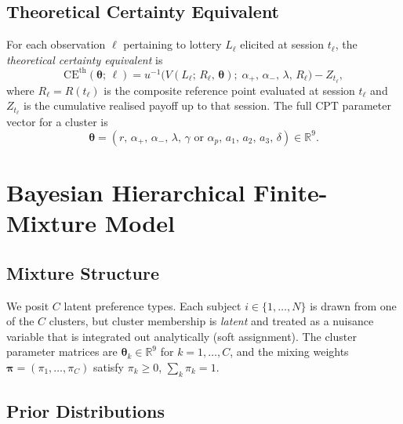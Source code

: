 \documentclass[12pt, a4paper]{article}
\newcommand{\R}{\mathbb{R}}
\newcommand{\btheta}{\bm{\theta}}
\newcommand{\bpi}{\bm{\pi}}
\begin{document}
\subsection{Theoretical Certainty Equivalent}
\label{sec:ce}

For each observation $\ell$ pertaining to lottery $L_\ell$ elicited at session
$t_\ell$, the \emph{theoretical certainty equivalent} is
\begin{equation}
  \mathrm{CE}^{\mathrm{th}}(\btheta;\, \ell)
  = u^{-1}\!\bigl(V(L_\ell;\, R_\ell,\, \btheta);\;
                  \alpha_+,\, \alpha_-,\, \lambda,\, R_\ell\bigr)
  - Z_{t_\ell},
  \label{eq:ce_th}
\end{equation}
where $R_\ell = R(t_\ell)$ is the composite reference point evaluated at
session $t_\ell$ and $Z_{t_\ell}$ is the cumulative realised payoff up to that
session.  The full CPT parameter vector for a cluster is
\begin{equation}
  \btheta = (r,\, \alpha_+,\, \alpha_-,\, \lambda,\,
             \gamma\text{ or }\alpha_p,\,
             a_1,\, a_2,\, a_3,\, \delta) \in \R^9.
  \label{eq:param_vec}
\end{equation}

\section{Bayesian Hierarchical Finite-Mixture Model}
\label{sec:model}

\subsection{Mixture Structure}
\label{sec:mixture}

We posit $C$ latent preference types.  Each subject $i \in \{1,\ldots,N\}$ is
drawn from one of the $C$ clusters, but cluster membership is \emph{latent} and
treated as a nuisance variable that is integrated out analytically (soft
assignment).  The cluster parameter matrices are
$\btheta_k \in \R^9$ for $k = 1, \ldots, C$, and the mixing weights
$\bpi = (\pi_1, \ldots, \pi_C)$ satisfy $\pi_k \geq 0$, $\sum_k \pi_k = 1$.

\subsection{Prior Distributions}
\label{sec:priors}
\end{document}
